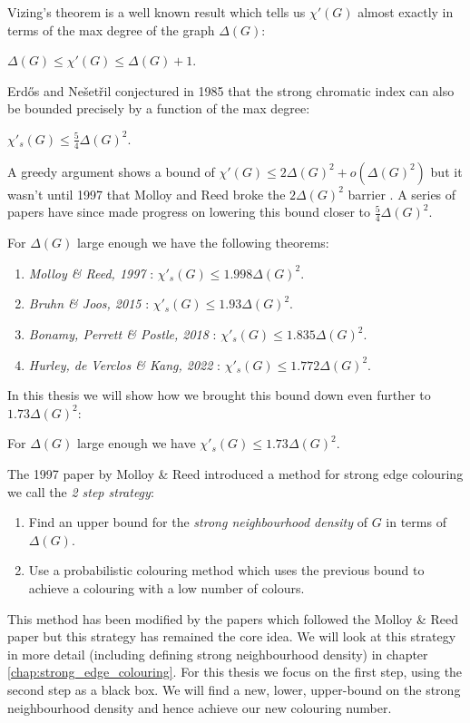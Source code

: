 Vizing's theorem is a well known result which tells us $\chi'(G)$ almost exactly in terms of
the max degree of the graph $\Delta(G)$:
\begin{knowntheorem}
    $\Delta(G) \leq \chi'(G) \leq \Delta(G) + 1$.
\end{knowntheorem}
Erd\H{o}s and Nešetřil conjectured in 1985 that
the strong chromatic index can also be bounded precisely by a function of the max degree:
\begin{knownconjecture}
    \label{conj:intro_erdos_nesetril}
    $\chi'_s(G) \leq \frac{5}{4}\Delta(G)^2$.
\end{knownconjecture}
A greedy argument shows a bound of $\chi'(G) \leq 2\Delta(G)^2 + o(\Delta(G)^2)$ but it wasn't until
1997 that Molloy and Reed broke the $2\Delta(G)^2$ barrier \cite{molloyBoundStrongChromatic1997}.
A series of papers have since made progress on lowering this bound closer to $\frac{5}{4}\Delta(G)^2$.

For $\Delta(G)$ large enough we have the following theorems:
\begin{enumerate}
  \item \textit{Molloy \& Reed, 1997} \cite{molloyBoundStrongChromatic1997}:
        $\chi'_s(G) \leq 1.998\Delta(G)^2$.
  \item \textit{Bruhn \& Joos, 2015} \cite{bruhnStrongerBoundStrong2018}:
        $\chi'_s(G) \leq 1.93\Delta(G)^2$.
  \item \textit{Bonamy, Perrett \& Postle, 2018} \cite{bonamyColouringGraphsSparse2018}:
        $\chi'_s(G) \leq 1.835\Delta(G)^2$.
  \item \textit{Hurley, de Verclos \& Kang, 2022} \cite{hurleyImprovedProcedureColouring2022}:
        $\chi'_s(G) \leq 1.772\Delta(G)^2$.
\end{enumerate}

In this thesis we will show how we brought this bound down even further to $1.73\Delta(G)^2$:
\begin{knowntheorem}
    For $\Delta(G)$ large enough we have
    $\chi'_s(G) \leq 1.73\Delta(G)^2$.
\end{knowntheorem}

The 1997 paper by Molloy \& Reed introduced a method for strong edge colouring we call the
\textit{2 step strategy}:
\begin{enumerate}
    \item Find an upper bound for the \textit{strong neighbourhood density} of $G$ in terms of
        $\Delta(G)$.
    \item Use a probabilistic colouring method which uses the previous bound to achieve a colouring
        with a low number of colours.
\end{enumerate}
This method has been modified by the papers which followed the Molloy \& Reed paper but this
strategy has remained the core idea. We will look at this strategy in more detail (including
defining strong neighbourhood density) in chapter \ref{chap:strong_edge_colouring}.
For this thesis we focus on the first step, using the second step as a black box. We will
find a new, lower, upper-bound on the strong neighbourhood density and hence achieve our
new colouring number.

